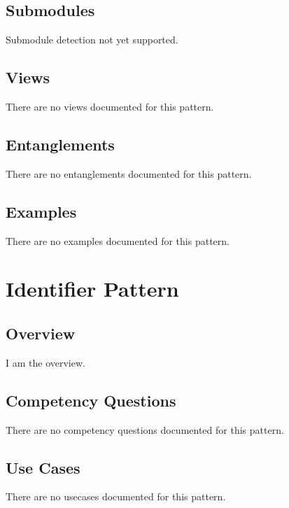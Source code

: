 \subsection{Submodules}
\label{ssec:submodules}
Submodule detection not yet supported.

\subsection{Views}
\label{ssec:views}
There are no views documented for this pattern.


\subsection{Entanglements}
\label{ssec:entanglements}
There are no entanglements documented for this pattern.

\subsection{Examples}
\label{ssec:examples}
There are no examples documented for this pattern.


\section{Identifier Pattern}
\label{sec:identifier-pattern}
\subsection{Overview}
\label{ssec:overview}
I am the overview.

\subsection{Competency Questions}
\label{ssec:cqs}
There are no competency questions documented for this pattern.

\subsection{Use Cases}
\label{ssec:use-cases}
There are no usecases documented for this pattern.
